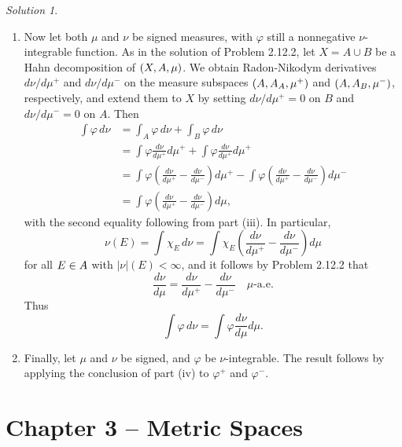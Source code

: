 \documentclass{report}
\let\cal\relax
\newcommand{\cal}[1]{\mathcal{#1}}
\theoremstyle{remark}
\newtheorem*{solution}{Solution}
\begin{document}
\begin{solution}
\begin{enumerate}[label=(\roman*)]
    \item Now let both $\mu$ and $\nu$ be signed measures, with $\varphi$ still a nonnegative $\nu$-integrable function. As in the solution of Problem 2.12.2, let $X = A \cup B$ be a Hahn decomposition of $(X, \cal A, \mu)$. We obtain Radon-Nikodym derivatives $d\nu/d\mu^+$ and $d\nu/d\mu^-$ on the measure subspaces $(A, \cal A_A, \mu^+)$ and $(A, \cal A_B, \mu^-)$, respectively, and extend them to $X$ by setting $d\nu/d\mu^+ = 0$ on $B$ and $d\nu/d\mu^- = 0$ on $A$. Then
      \begin{equation*}
        \begin{split}
          \int \varphi \, d\nu &= \int_A \varphi \, d\nu + \int_B \varphi \, d\nu \\
          &= \int \varphi \frac{d\nu}{d\mu^+} d\mu^+ + \int \varphi \frac{d\nu}{d\mu^+} d\mu^+ \\
          &= \int \varphi \left( \frac{d\nu}{d\mu^+} - \frac{d\nu}{d\mu^-} \right) d\mu^+ - \int \varphi \left( \frac{d\nu}{d\mu^+} - \frac{d\nu}{d\mu^-} \right) d\mu^- \\
          &= \int \varphi \left( \frac{d\nu}{d\mu^+} - \frac{d\nu}{d\mu^-} \right) d\mu,
        \end{split}
      \end{equation*}
      with the second equality following from part (iii). In particular,
      \begin{equation*}
        \nu(E) = \int \chi_E \, d\nu = \int \chi_E \left( \frac{d\nu}{d\mu^+} - \frac{d\nu}{d\mu^-} \right) d\mu
      \end{equation*}
      for all $E \in \cal A$ with $|\nu|(E) < \infty$, and it follows by Problem 2.12.2 that
      \begin{equation*}
        \frac{d\nu}{d\mu} = \frac{d\nu}{d\mu^+} - \frac{d\nu}{d\mu^-}  \quad \text{$\mu$-a.e.}
      \end{equation*}
      Thus
      \begin{equation*}
        \int \varphi \, d\nu = \int \varphi \frac{d\nu}{d\mu} d\mu.
      \end{equation*}

    \item Finally, let $\mu$ and $\nu$ be signed, and $\varphi$ be $\nu$-integrable. The result follows by applying the conclusion of part (iv) to $\varphi^+$ and $\varphi^-$.
  \end{enumerate}
\end{solution}

\chapter*{Chapter 3 -- Metric Spaces}
\end{document}
